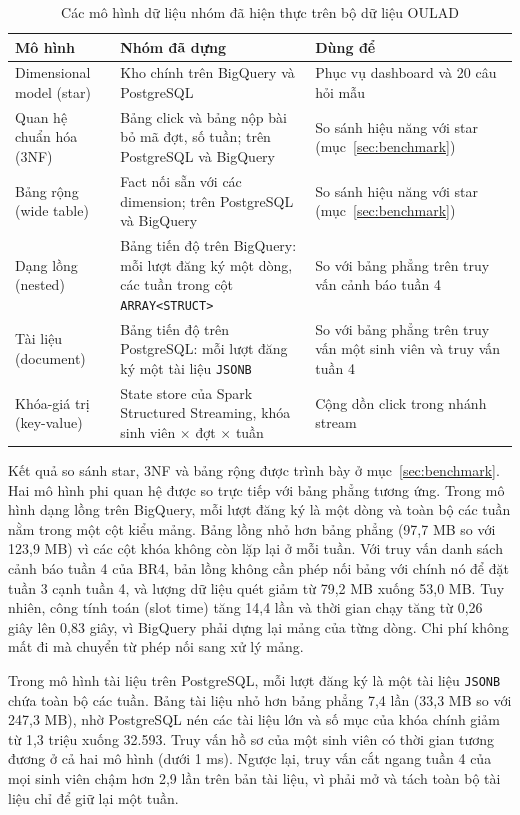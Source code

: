 \begin{table}[htbp]
\centering
\small
\begin{tabularx}{\textwidth}{|p{3.0cm}|X|p{4.2cm}|}
\hline
\textbf{Mô hình} & \textbf{Nhóm đã dựng} & \textbf{Dùng để} \\ \hline
Dimensional model (star) & Kho chính trên BigQuery và PostgreSQL & Phục vụ dashboard và 20 câu hỏi mẫu \\ \hline
Quan hệ chuẩn hóa (3NF) & Bảng click và bảng nộp bài bỏ mã đợt, số tuần; trên PostgreSQL và BigQuery & So sánh hiệu năng với star (mục~\ref{sec:benchmark}) \\ \hline
Bảng rộng (wide table) & Fact nối sẵn với các dimension; trên PostgreSQL và BigQuery & So sánh hiệu năng với star (mục~\ref{sec:benchmark}) \\ \hline
Dạng lồng (nested) & Bảng tiến độ trên BigQuery: mỗi lượt đăng ký một dòng, các tuần trong cột \texttt{ARRAY<STRUCT>} & So với bảng phẳng trên truy vấn cảnh báo tuần 4 \\ \hline
Tài liệu (document) & Bảng tiến độ trên PostgreSQL: mỗi lượt đăng ký một tài liệu \texttt{JSONB} & So với bảng phẳng trên truy vấn một sinh viên và truy vấn tuần 4 \\ \hline
Khóa-giá trị (key-value) & State store của Spark Structured Streaming, khóa sinh viên $\times$ đợt $\times$ tuần & Cộng dồn click trong nhánh stream \\ \hline
\end{tabularx}
\caption{Các mô hình dữ liệu nhóm đã hiện thực trên bộ dữ liệu OULAD}
\label{tab:mo-hinh}
\end{table}

Kết quả so sánh star, 3NF và bảng rộng được trình bày ở mục~\ref{sec:benchmark}. Hai mô hình phi quan hệ được so trực tiếp với bảng phẳng tương ứng. Trong mô hình dạng lồng trên BigQuery, mỗi lượt đăng ký là một dòng và toàn bộ các tuần nằm trong một cột kiểu mảng. Bảng lồng nhỏ hơn bảng phẳng (97,7 MB so với 123,9 MB) vì các cột khóa không còn lặp lại ở mỗi tuần. Với truy vấn danh sách cảnh báo tuần 4 của BR4, bản lồng không cần phép nối bảng với chính nó để đặt tuần 3 cạnh tuần 4, và lượng dữ liệu quét giảm từ 79,2 MB xuống 53,0 MB. Tuy nhiên, công tính toán (slot time) tăng 14,4 lần và thời gian chạy tăng từ 0,26 giây lên 0,83 giây, vì BigQuery phải dựng lại mảng của từng dòng. Chi phí không mất đi mà chuyển từ phép nối sang xử lý mảng.

Trong mô hình tài liệu trên PostgreSQL, mỗi lượt đăng ký là một tài liệu \texttt{JSONB} chứa toàn bộ các tuần. Bảng tài liệu nhỏ hơn bảng phẳng 7,4 lần (33,3 MB so với 247,3 MB), nhờ PostgreSQL nén các tài liệu lớn và số mục của khóa chính giảm từ 1,3 triệu xuống 32.593. Truy vấn hồ sơ của một sinh viên có thời gian tương đương ở cả hai mô hình (dưới 1 ms). Ngược lại, truy vấn cắt ngang tuần 4 của mọi sinh viên chậm hơn 2,9 lần trên bản tài liệu, vì phải mở và tách toàn bộ tài liệu chỉ để giữ lại một tuần.

